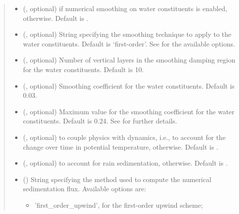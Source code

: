 \documentclass[letterpaper,10pt,english]{sphinxmanual}
\begin{document}
\begin{fulllineitems}
\begin{fulllineitems}
\begin{quote}
\begin{description}
\begin{itemize}
\item {} 
 (, optional) \textendash{}  if numerical smoothing on water constituents is enabled,  otherwise.
Default is .

\item {} 
 (, optional) \textendash{} String specifying the smoothing technique to apply to the water constituents. Default is ‘first-order’.
See  for the available options.

\item {} 
 (, optional) \textendash{} Number of vertical layers in the smoothing damping region for the water constituents. Default is 10.

\item {} 
 (, optional) \textendash{} Smoothing coefficient for the water constituents. Default is 0.03.

\item {} 
 (, optional) \textendash{} Maximum value for the smoothing coefficient for the water constituents. Default is 0.24.
See  for further details.

\item {} 
 (, optional) \textendash{}  to couple physics with dynamics, i.e., to account for the change over time in potential
temperature,  otherwise. Default is .

\item {} 
 (, optional) \textendash{}  to account for rain sedimentation,  otherwise. Default is .

\item {} 
 () \textendash{} 
String specifying the method used to compute the numerical sedimentation flux. Available options are:
\begin{itemize}
\item {} 
’first\_order\_upwind’, for the first-order upwind scheme;


\end{itemize}
\end{itemize}
\end{description}
\end{quote}
\end{fulllineitems}
\end{fulllineitems}
\end{document}
